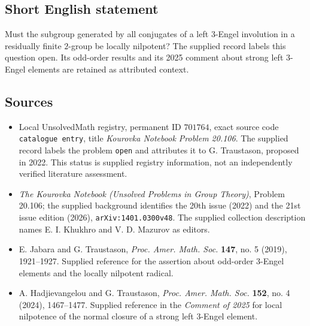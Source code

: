 \documentclass[11pt]{article}
\begin{document}
\subsection{Short English statement}
Must the subgroup generated by all conjugates of a left \(3\)-Engel involution in a residually finite \(2\)-group be locally nilpotent? The supplied record labels this question open. Its odd-order results and its 2025 comment about strong left \(3\)-Engel elements are retained as attributed context.
\subsection{Sources}
\begin{itemize}
\item Local UnsolvedMath registry, permanent ID \(701764\), exact source code \texttt{catalogue entry}, title \emph{Kourovka Notebook Problem 20.106}. The supplied record labels the problem \texttt{open} and attributes it to G. Traustason, proposed in 2022. This status is supplied registry information, not an independently verified literature assessment.
\item \emph{The Kourovka Notebook (Unsolved Problems in Group Theory)}, Problem 20.106; the supplied background identifies the 20th issue (2022) and the 21st issue edition (2026), \texttt{arXiv:1401.0300v48}. The supplied collection description names E. I. Khukhro and V. D. Mazurov as editors.
\item E. Jabara and G. Traustason, \emph{Proc. Amer. Math. Soc.} \textbf{147}, no. 5 (2019), 1921--1927. Supplied reference for the assertion about odd-order \(3\)-Engel elements and the locally nilpotent radical.
\item A. Hadjievangelou and G. Traustason, \emph{Proc. Amer. Math. Soc.} \textbf{152}, no. 4 (2024), 1467--1477. Supplied reference in the \emph{Comment of 2025} for local nilpotence of the normal closure of a strong left \(3\)-Engel element.
\end{itemize}
\end{document}
